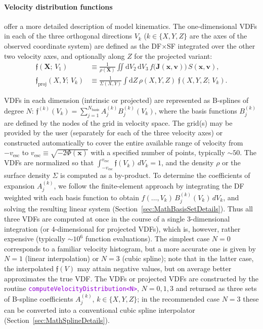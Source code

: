 \documentclass[12pt]{article}
\newcommand{\ttt}[1]{\textcolor{darkviolet}{\texttt{#1}}}
\renewcommand{\d}{\mathrm{d}}
\newcommand{\bv}{\boldsymbol{v}}
\newcommand{\bx}{\boldsymbol{x}}
\newcommand{\bX}{\boldsymbol{X}}
\newcommand{\bJ}{\boldsymbol{J}}
\let\oldparagraph\paragraph
\renewcommand{\paragraph}[1]{\vspace{-2mm}\oldparagraph{#1}}
\begin{document}
\paragraph{Velocity distribution functions}  \label{sec:VDF} offer a more detailed description of model kinematics. The one-dimensional VDFs in each of the three orthogonal directions $V_k$ ($k\in\{X,Y,Z\}$ are the axes of the observed coordinate system) are defined as the DF$\times$SF integrated over the other two velocity axes, and optionally along $Z$ for the projected variant:
\begin{align*}
\mathfrak{f}(\bX;\,V_1) &\equiv \frac{1}{\rho(\bX)} \iint \d V_2\,\d V_3\, f\big(\bJ(\bx,\bv)\big)\,S(\bx,\bv) ,\\
\mathfrak{f}_\mathrm{proj}(X,Y;\,V_k) &\equiv \frac{1}{\Sigma(X,Y)} \int \d Z\, \rho(X,Y,Z)\;\mathfrak{f}(X,Y,Z;\,V_k) .
\end{align*}

VDFs in each dimension (intrinsic or projected) are represented as B-splines of degree $N$: $\mathfrak{f}^{(k)}(V_k) = \sum_{j=1}^{N_\mathrm{basis}} A_j^{(k)} B_j^{(k)}(V_k)$, where the basis functions $B_j^{(k)}$ are defined by the nodes of the grid in velocity space. The grid(s) may be provided by the user (separately for each of the three velocity axes) or constructed automatically to cover the entire available range of velocity from $-v_\mathrm{esc}$ to $v_\mathrm{esc}\equiv \sqrt{-2\Phi(\bx)}$ with a specified number of points, typically $\sim 50$. The VDFs are normalized so that $\int_{-v_\mathrm{esc}}^{v_\mathrm{esc}} \mathfrak{f}(V_k)\,dV_k = 1$, and the density $\rho$ or the surface density $\Sigma$ is computed as a by-product. To determine the coefficients of expansion $A_j^{(k)}$, we follow the finite-element approach by integrating the DF weighted with each basis function to obtain $f(\dots,V_k)\,B_j^{(k)}(V_k)\,dV_k$, and solving the resulting linear system (Section~\ref{sec:MathBasisSetDetails}). Thus all three VDFs are computed at once in the course of a single 3-dimensional integration (or 4-dimensional for projected VDFs), which is, however, rather expensive (typically $\sim 10^6$ function evaluations). The simplest case $N=0$ corresponds to a familiar velocity histogram, but a more accurate one is given by $N=1$ (linear interpolation) or $N=3$ (cubic spline); note that in the latter case, the interpolated $\mathfrak{f}(V)$ may attain negative values, but on average better approximates the true VDF.
The VDFs or projected VDFs are constructed by the routine \ttt{computeVelocityDistribution<N>}, $N=0,1,3$ and returned as three sets of B-spline coefficients $A_j^{(k)}$, $k\in\{X,Y,Z\}$; in the recommended case $N=3$ these can be converted into a conventional cubic spline interpolator (Section~\ref{sec:MathSplineDetails}).
\end{document}
